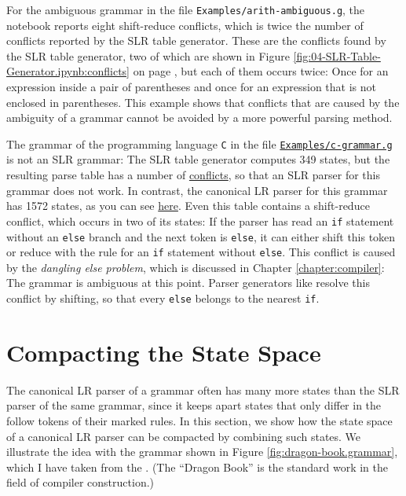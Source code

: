 For the ambiguous grammar in the file \texttt{Examples/arith-ambiguous.g}, the notebook reports eight shift-reduce
conflicts, which is twice the number of conflicts reported by the SLR table generator.  These are the conflicts
found by the SLR table generator, two of which are shown in Figure \ref{fig:04-SLR-Table-Generator.ipynb:conflicts} on
page \pageref{fig:04-SLR-Table-Generator.ipynb:conflicts}, but each of them occurs twice:  Once for an expression
inside a pair of parentheses and once for an expression that is not enclosed in parentheses.  This example shows that
conflicts that are caused by the ambiguity of a grammar cannot be avoided by a more powerful parsing method.

The grammar of the programming language \texttt{C} in the file
\href{https://github.com/karlstroetmann/Formal-Languages/blob/master/Python/Chapter-10/Examples/c-grammar.g}{\texttt{Examples/c-grammar.g}}
is not an SLR grammar:  The SLR table generator computes 349 states, but the resulting parse table has a number of
\href{https://github.com/karlstroetmann/Formal-Languages/blob/master/Python/Chapter-10/Examples/c-grammar-slr-table.txt}{conflicts},
so that an SLR parser for this grammar does not work.  In contrast, the canonical LR parser for this grammar has
1572 states, as you can see
\href{https://github.com/karlstroetmann/Formal-Languages/blob/master/Python/Chapter-10/Examples/c-grammar-lr-table.txt}{here}.
Even this table contains a shift-reduce conflict, which occurs in two of its states:  If the parser has read
an \texttt{if} statement without an \texttt{else} branch and the next token is \texttt{else}, it can either
shift this token or reduce with the rule for an \texttt{if} statement without \texttt{else}.  This conflict is
caused by the \emph{dangling else problem}, which is discussed in Chapter \ref{chapter:compiler}:  The grammar
is ambiguous at this point.  Parser generators like  resolve this conflict by shifting, so
that every \texttt{else} belongs to the nearest \texttt{if}.

\section{Compacting the State Space \label{section:compacting}}
The canonical LR parser of a grammar often has many more states than the SLR parser of the same grammar, since it
keeps apart states that only differ in the follow tokens of their marked rules.  In this section, we show how the
state space of a canonical LR parser can be compacted by combining such states.  We illustrate the idea with the
grammar shown in Figure \ref{fig:dragon-book.grammar}, which I have taken from the 
\cite{aho:2006}.  (The ``Dragon Book'' is the standard work in the field of compiler construction.)

